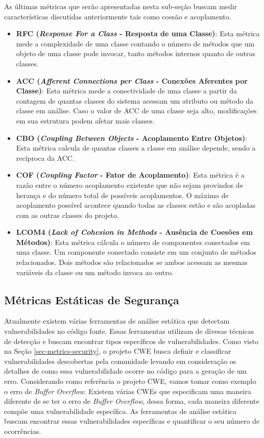 %

As últimas métricas que serão apresentadas nesta sub-seção buscam medir características discutidas anteriormente tais como coesão e acoplamento.

%

\begin{itemize}
\item \textbf{RFC (\emph{Response For a Class} - Resposta de uma Classe)}: Esta métrica mede a complexidade de uma classe contando o número de métodos que um objeto de uma classe pode invocar, tanto métodos internos quanto de outras classes.
\item \textbf{ACC (\emph{Afferent Connections per Class} - Conexões Aferentes por Classe)}: Esta métrica mede a conectividade de uma classe a partir da contagem de quantas classes do sistema acessam um atributo ou método da classe em análise. Caso o valor de ACC de uma classe seja alto, modificações em sua estrutura podem afetar mais classes.
\item \textbf{CBO (\emph{Coupling Between Objects} - Acoplamento Entre Objetos)}: Esta métrica calcula de quantas classes a classe em análise depende, sendo a recíproca da ACC.
\item \textbf{COF (\emph{Coupling Factor} - Fator de Acoplamento)}: Esta métrica é a razão entre o número acoplamento existente que não sejam provindos de herança e do número total de possíveis acoplamentos. O máximo de acoplamento possível acontece quando todas as classes estão e são acopladas com as outras classes do projeto.
\item \textbf{LCOM4 (\emph{Lack of Cohesion in Methods} - Ausência de Coesões em Métodos)}: Esta métrica cálcula o número de componentes conectados em uma classe. Um componente conectado consiste em um conjunto de métodos relacionados. Dois métodos são relacionados se ambos acessam as mesmas variáveis da classe ou um método invoca ao outro.
\end{itemize}


\subsection{Métricas Estáticas de Segurança}
\label{subsec-security-metrics}

Atualmente existem várias ferramentas de análise estática que detectam vulnerabilidades no código fonte. Essas ferramentas utilizam de divesas técnicas de detecção e buscam encontrar tipos específicos de vulnerabilidades. Como visto na Seção \ref{sec-metrics-security}, o projeto CWE busca definir  e classificar vulnerabilidades descobertas pela comunidade levando em consideração os detalhes de como essa vulnerabilidade ocorre no código para a geração de um erro. Considerando como referência o projeto CWE, vamos tomar como exemplo o erro de \emph{Buffer Overflow}. Existem várias CWEs que especificam uma maneira diferente de se ter o erro de \emph{Buffer Overflow}, dessa forma, cada maneira diferente compõe uma vulnerabilidade específica. As ferramentas de análise estática buscam  encontrar essas vulnerabilidades específicas e quantificar o seu número de ocorrências. 

